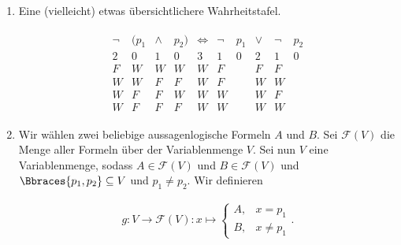 
\begin{solution}

\phantom{}

\begin{enumerate}[label = \alph*.]

    \item Eine (vielleicht) etwas übersichtlichere Wahrheitstafel.

    \begin{align*}
        \begin{array}{cccccccccc}
            \neg & (p_1 & \land & p_2) & \iff & \neg & p_1 & \lor & \neg & p_2 \\
            \hline
            2 & 0 & 1 & 0 & 3 & 1 & 0 & 2 & 1 & 0 \\
            \hline
            F & W & W & W & W & F & & F & F & \\
            W & W & F & F & W & F & & W & W & \\
            W & F & F & W & W & W & & W & F & \\
            W & F & F & F & W & W & & W & W &
        \end{array}
    \end{align*}

    \item Wir wählen zwei beliebige aussagenlogische Formeln $A$ und $B$.
    Sei $\mathcal{F}(V)$ die Menge aller Formeln über der Variablenmenge $V$.
    Sei nun $V$ eine Variablenmenge, sodass $A \in \mathcal{F}(V)$ und $B \in \mathcal{F}(V)$ und $\Bbraces{p_1, p_2} \subseteq V$ und $p_1 \neq p_2$.
    Wir definieren

    \begin{align*}
        g:
        V \to \mathcal{F}(V):
        x \mapsto
        \begin{cases}
            A, & x = p_1 \\
            B, & x \neq p_1
        \end{cases}.
    \end{align*}



\end{enumerate}
\end{solution}

